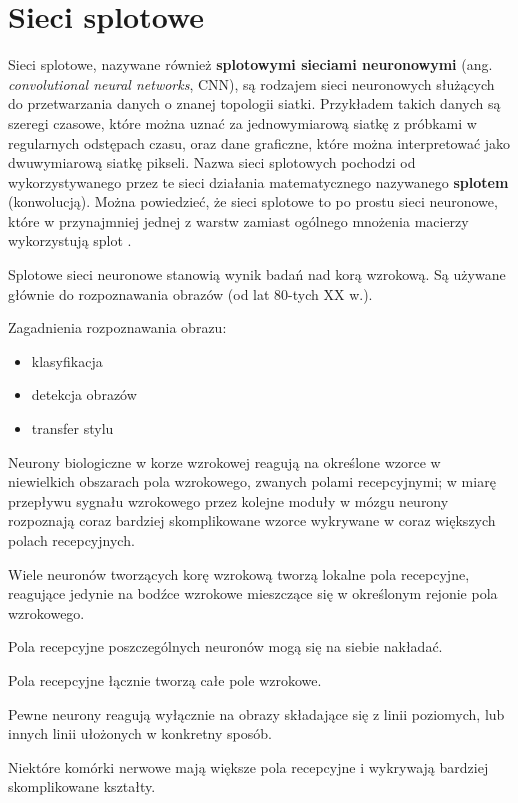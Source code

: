 \documentclass[12pt]{mwbk}
\theoremstyle{plain}
\theoremstyle{definition}
\theoremstyle{remark}
\begin{document}
\section{Sieci splotowe}

Sieci splotowe, nazywane również \textbf{splotowymi sieciami neuronowymi} (ang. \emph{convolutional neural networks}, CNN), są rodzajem sieci neuronowych służących do przetwarzania danych o znanej topologii siatki. Przykładem takich danych są szeregi czasowe, które można uznać za jednowymiarową siatkę z próbkami w regularnych odstępach czasu, oraz dane graficzne, które można interpretować jako dwuwymiarową siatkę pikseli. Nazwa sieci splotowych pochodzi od wykorzystywanego przez te sieci działania matematycznego nazywanego \textbf{splotem} (konwolucją). Można powiedzieć, że sieci splotowe to po prostu sieci neuronowe, które w przynajmniej jednej z warstw zamiast ogólnego mnożenia macierzy wykorzystują splot \cite{goodfellow}.


\cite{geron}

Splotowe sieci neuronowe stanowią wynik badań nad korą wzrokową. Są używane głównie do rozpoznawania obrazów (od lat 80-tych XX w.).

Zagadnienia rozpoznawania obrazu:
\begin{itemize}
	\item klasyfikacja
	\item detekcja obrazów
	\item transfer stylu
\end{itemize}

Neurony biologiczne w korze wzrokowej reagują na określone wzorce w niewielkich obszarach pola wzrokowego, zwanych polami recepcyjnymi; w miarę przepływu sygnału wzrokowego przez kolejne moduły w mózgu neurony rozpoznają coraz bardziej skomplikowane wzorce wykrywane w coraz większych polach recepcyjnych.

Wiele neuronów tworzących korę wzrokową tworzą lokalne pola recepcyjne, reagujące jedynie na bodźce wzrokowe mieszczące się w określonym rejonie pola wzrokowego.

Pola recepcyjne poszczególnych neuronów mogą się na siebie nakładać.

Pola recepcyjne łącznie tworzą całe pole wzrokowe.

Pewne neurony reagują wyłącznie na obrazy składające się z linii poziomych, lub innych linii ułożonych w konkretny sposób.

Niektóre komórki nerwowe mają większe pola recepcyjne i wykrywają bardziej skomplikowane kształty.
\end{document}
